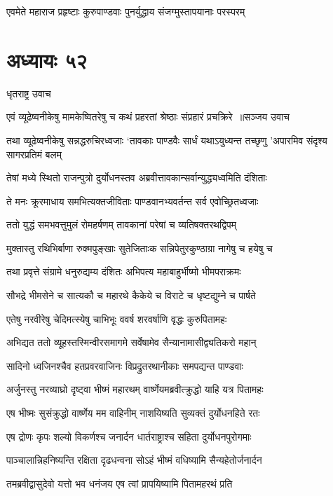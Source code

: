 \twolineshloka
{एवमेते महाराज प्रहृष्टाः कुरुपाण्डवाः}
{पुनर्युद्धाय संजग्मुस्तापयानाः परस्परम्}


\chapter{अध्यायः ५२}
\twolineshloka
{धृतराष्ट्र उवाच}
{}


\threelineshloka
{एवं व्यूढेष्वनीकेषु मामकेष्वितरेषु च}
{कथं प्रहरतां श्रेष्ठाः संप्रहारं प्रचक्रिरे ॥सञ्जय उवाच}
{}


\threelineshloka
{तथा व्यूढेष्वनीकेषु सन्नद्धरुचिरध्वजाः}
{`तावकाः पाण्डवैः सार्धं यथाऽयुध्यन्त तच्छृणु}
{'अपारमिव संदृश्य सागरप्रतिमं बलम्}


\twolineshloka
{तेषां मध्ये स्थितो राजन्पुत्रो दुर्योधनस्तव}
{अब्रवीत्तावकान्सर्वान्युद्ध्यध्वमिति दंशिताः}


\twolineshloka
{ते मनः क्रूरमाधाय समभित्यक्तजीविताः}
{पाण्डवानभ्यवर्तन्त सर्व एवोच्छ्रितध्वजाः}


\twolineshloka
{ततो युद्धं समभवत्तुमुलं रोमहर्षणम्}
{तावकानां परेषां च व्यतिषक्तरथद्विपम्}


\twolineshloka
{मुक्तास्तु रथिभिर्बाणा रुक्मपुङ्खाः सुतेजिताःक}
{सन्निपेतुरकुण्ठाग्रा नागेषु च हयेषु च}


\twolineshloka
{तथा प्रवृत्ते संग्रामे धनुरुद्यम्य दंशितः}
{अभिपत्य महाबाहुर्भीष्मो भीमपराक्रमः}


\twolineshloka
{सौभद्रे भीमसेने च सात्यकौ च महारथे}
{कैकेये च विराटे च धृष्टद्युम्ने च पार्षते}


\twolineshloka
{एतेषु नरवीरेषु चेदिमत्स्येषु चाभिभूः}
{ववर्ष शरवर्षाणि वृद्धः कुरुपितामहः}


\twolineshloka
{अभिद्यत ततो व्यूहस्तस्मिन्वीरसमागमे}
{सर्वेषामेव सैन्यानामासीद्व्यतिकरो महान्}


\twolineshloka
{सादिनो ध्वजिनश्चैव हतप्रवरवाजिनः}
{विप्रद्रुतरथानीकाः समपद्यन्त पाण्डवाः}


\twolineshloka
{अर्जुनस्तु नरव्याघ्रो दृष्ट्वा भीष्मं महारथम्}
{वार्ष्णेयमब्रवीत्क्रुद्धो याहि यत्र पितामहः}


\twolineshloka
{एष भीष्मः सुसंक्रुद्धो वार्ष्णेय मम वाहिनीम्}
{नाशयिष्यति सुव्यक्तं दुर्योधनहिते रतः}


\twolineshloka
{एष द्रोणः कृपः शल्यो विकर्णश्च जनार्दन}
{धार्तराष्ट्राश्च सहिता दुर्योधनपुरोगमाः}


\twolineshloka
{पाञ्चालान्निहनिष्यन्ति रक्षिता दृढधन्वना}
{सोऽहं भीष्मं वधिष्यामि सैन्यहेतोर्जनार्दन}


\twolineshloka
{तमब्रवीद्वासुदेवो यत्तो भव धनंजय}
{एष त्वां प्रापयिष्यामि पितामहरथं प्रति}


